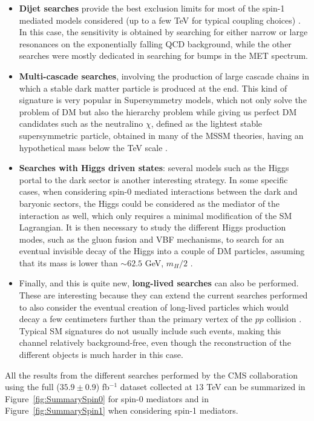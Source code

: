 \documentclass[a4paper, 10pt, openright]{report}
\begin{document}
\begin{itemize}
\item \textbf{Dijet searches} provide the best exclusion limits for most of the spin-1 mediated models considered (up to a few TeV for typical coupling choices) \cite{DijetAtlas, DijetCMS}. In this case, the sensitivity is obtained by searching for either narrow or large resonances on the exponentially falling QCD background, while the other searches were mostly dedicated in searching for bumps in the \ac{MET} spectrum.
\item \textbf{Multi-cascade searches}, involving the production of large cascade chains in which a stable dark matter particle is produced at the end. This kind of signature is very popular in Supersymmetry models, which not only solve the problem of \ac{DM} but also the hierarchy problem while giving us perfect \ac{DM} candidates such as the neutralino $\chi$, defined as the lightest stable supersymmetric particle, obtained in many of the \ac{MSSM} theories, having an hypothetical mass below the TeV scale \cite{SUSYDM}.
\item \textbf{Searches with Higgs driven states}: several models such as the Higgs portal to the dark sector is another interesting strategy. In some specific cases, when considering spin-0 mediated interactions between the dark and baryonic sectors, the Higgs could be considered as the mediator of the interaction as well, which only requires a minimal modification of the \ac{SM} Lagrangian. It is then necessary to study the different Higgs production modes, such as the gluon fusion and \ac{VBF} mechanisms, to search for an eventual invisible decay of the Higgs into a couple of \ac{DM} particles, assuming that its mass is lower than $\sim 62.5$ GeV, $m_H/2$ \cite{InvisibleHiggs}.
\item Finally, and this is quite new, \textbf{long-lived searches} can also be performed. These are interesting because they can extend the current searches performed to also consider the eventual creation of long-lived particles which would decay a few centimeters further than the primary vertex of the $pp$ collision \cite{LLSearches}. Typical \ac{SM} signatures do not usually include such events, making this channel relatively background-free, even though the reconstruction of the different objects is much harder in this case.
\end{itemize}

All the results from the different searches performed by the \ac{CMS} collaboration using the full ($35.9 \pm 0.9$) fb$^{-1}$ dataset collected at $13$ TeV can be summarized in Figure~\ref{fig:SummarySpin0} for spin-0 mediators and in Figure~\ref{fig:SummarySpin1} when considering spin-1 mediators.
\end{document}
